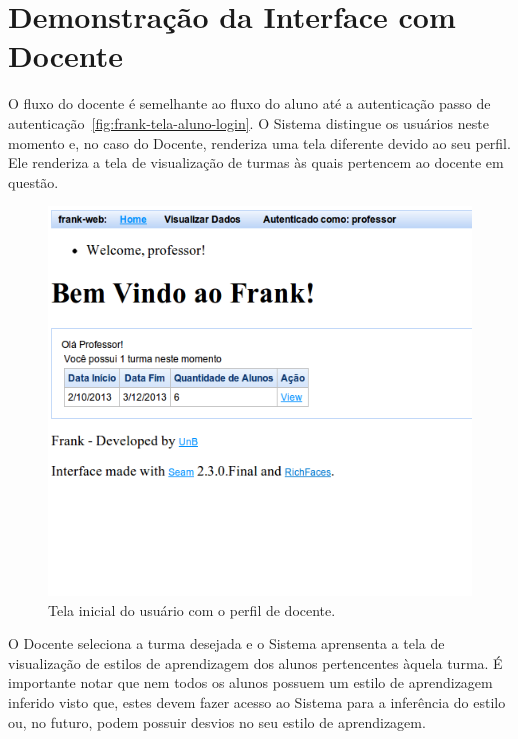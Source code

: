 \section{Demonstração da Interface com Docente}\label{section:interface-docente}
O fluxo do docente é semelhante ao fluxo do aluno até a autenticação passo de autenticação~\ref{fig:frank-tela-aluno-login}. O Sistema distingue os usuários neste momento e, no caso do Docente, renderiza uma tela diferente devido ao seu perfil. Ele renderiza a tela de visualização de turmas às quais pertencem ao docente em questão.

\begin{figure}
	\centering
	\includegraphics[scale=0.48]{images/frank-tela-professor-acesso.png}
	\caption{Tela inicial do usuário com o perfil de docente.}
	\label{fig:frank-tela-professor-acesso}
\end{figure}

O Docente seleciona a turma desejada e o Sistema aprensenta a tela de visualização de estilos de aprendizagem dos alunos pertencentes àquela turma. É importante notar que nem todos os alunos possuem um estilo de aprendizagem inferido visto que, estes devem fazer acesso ao Sistema para a inferência do estilo ou, no futuro, podem possuir desvios no seu estilo de aprendizagem.

